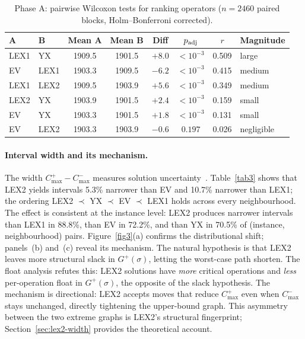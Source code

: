 \documentclass[preprint,12pt]{elsarticle}
\begin{document}
\begin{table}[t]
\centering
\caption{Phase A: pairwise Wilcoxon tests for ranking operators ($n = 2460$ paired blocks, Holm--Bonferroni corrected).}
\label{tab2}
\begin{tabular}{l l c c c c c l}
\hline
A & B & Mean A & Mean B & Diff & $p_{\rm adj}$ & $r$ & Magnitude \\
\hline
LEX1 & YX   & 1909.5 & 1901.5 & $+8.0$ & $<10^{-3}$ & 0.509 & large \\
EV   & LEX1 & 1903.3 & 1909.5 & $-6.2$ & $<10^{-3}$ & 0.415 & medium \\
LEX1 & LEX2 & 1909.5 & 1903.9 & $+5.6$ & $<10^{-3}$ & 0.349 & medium \\
LEX2 & YX   & 1903.9 & 1901.5 & $+2.4$ & $<10^{-3}$ & 0.159 & small \\
EV   & YX   & 1903.3 & 1901.5 & $+1.8$ & $<10^{-3}$ & 0.131 & small \\
EV   & LEX2 & 1903.3 & 1903.9 & $-0.6$ & $0.197$    & 0.026 & negligible \\
\hline
\end{tabular}
\end{table}

\paragraph{Interval width and its mechanism.} The width $C^+_{\max} - C^-_{\max}$ measures solution uncertainty~\cite{Moore2009,Lei2012c}. Table~\ref{tab3} shows that LEX2 yields intervals 5.3\% narrower than EV and 10.7\% narrower than LEX1; the ordering LEX2 $\prec$ YX $\prec$ EV $\prec$ LEX1 holds across every neighbourhood. The effect is consistent at the instance level: LEX2 produces narrower intervals than LEX1 in 88.8\%, than EV in 72.2\%, and than YX in 70.5\% of (instance, neighbourhood) pairs. Figure~\ref{fig3}(a) confirms the distributional shift; panels~(b) and~(c) reveal its mechanism. The natural hypothesis is that LEX2 leaves more structural slack in $G^+(\sigma)$, letting the worst-case path shorten. The float analysis refutes this: LEX2 solutions have \emph{more} critical operations and \emph{less} per-operation float in $G^+(\sigma)$, the opposite of the slack hypothesis. The mechanism is directional: LEX2 accepts moves that reduce $C^+_{\max}$ even when $C^-_{\max}$ stays unchanged, directly tightening the upper-bound graph. This asymmetry between the two extreme graphs is LEX2's structural fingerprint; Section~\ref{sec:lex2-width} provides the theoretical account.
\end{document}

